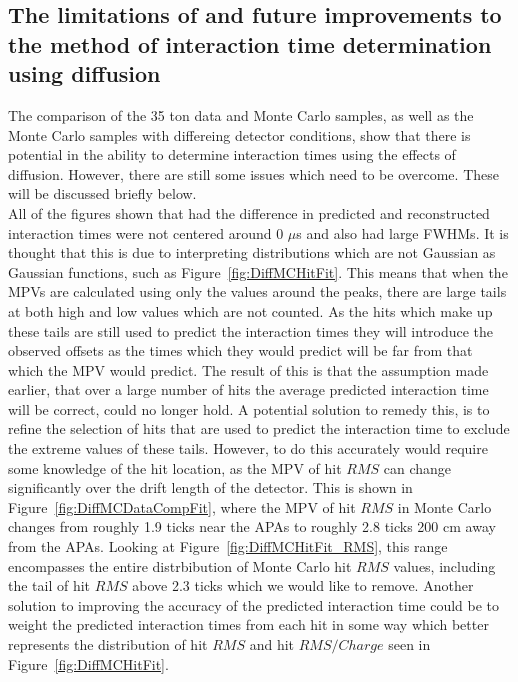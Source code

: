 \subsection{The limitations of and future improvements to the method of interaction time determination using diffusion} \label{sec:DiffLimitations}
The comparison of the 35 ton data and Monte Carlo samples, as well as the Monte Carlo samples with differeing detector conditions, show that there is potential in the ability to determine interaction times using the effects of diffusion. However, there are still some issues which need to be overcome. These will be discussed briefly below. \\

All of the figures shown that had the difference in predicted and reconstructed interaction times were not centered around 0 $\mu$s and also had large FWHMs. It is thought that this is due to interpreting distributions which are not Gaussian as Gaussian functions, such as Figure~\ref{fig:DiffMCHitFit}. This means that when the MPVs are calculated using only the values around the peaks, there are large tails at both high and low values which are not counted. As the hits which make up these tails are still used to predict the interaction times they will introduce the observed offsets as the times which they would predict will be far from that which the MPV would predict. The result of this is that the assumption made earlier, that over a large number of hits the average predicted interaction time will be correct, could no longer hold. A potential solution to remedy this, is to refine the selection of hits that are used to predict the interaction time to exclude the extreme values of these tails. However, to do this accurately would require some knowledge of the hit location, as the MPV of hit $RMS$ can change significantly over the drift length of the detector. This is shown in Figure~\ref{fig:DiffMCDataCompFit}, where the MPV of hit $RMS$ in Monte Carlo changes from roughly 1.9 ticks near the APAs to roughly 2.8 ticks 200 cm away from the APAs. Looking at Figure~\ref{fig:DiffMCHitFit_RMS}, this range encompasses the entire distrbibution of Monte Carlo hit $RMS$ values, including the tail of hit $RMS$ above 2.3 ticks which we would like to remove. Another solution to improving the accuracy of the predicted interaction time could be to weight the predicted interaction times from each hit in some way which better represents the distribution of hit $RMS$ and hit $RMS/Charge$ seen in Figure~\ref{fig:DiffMCHitFit}. \\

